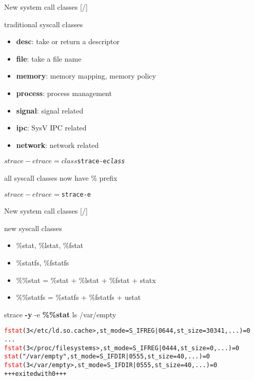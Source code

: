 \documentclass[unicode,aspectratio=169]{beamer}
\begin{document}
\begin{frame}[fragile]{New system call classes \hfill [\insertframenumber/\inserttotalframenumber]}
\begin{block}{\large traditional syscall classes}
\begin{itemize}
\item \textbf{desc}: take or return a descriptor
\item \textbf{file}: take a file name
\item \textbf{memory}: memory mapping, memory policy
\item \textbf{process}: process management
\item \textbf{signal}: signal related
\item \textbf{ipc}: SysV IPC related
\item \textbf{network}: network related
\end{itemize}
\vspace{-2\topsep}
\begin{alltt}
$ strace -e trace=\textit{class}
$ strace -e \textit{class}
\end{alltt}
\end{block}

\begin{block}{\large all syscall classes now have \% prefix}
\begin{alltt}
$ strace -e trace=%\textit{class}
$ strace -e %\textit{class}
\end{alltt}
\end{block}
\end{frame}

\begin{frame}[fragile]{New system call classes \hfill [\insertframenumber/\inserttotalframenumber]}
\begin{block}{\large new syscall classes}
\begin{itemize}
	\item \%stat, \%lstat, \%fstat
	\item \%statfs, \%fstatfs
	\item \%\%stat = \%stat + \%lstat + \%fstat + statx
	\item \%\%statfs = \%statfs + \%fstatfs + ustat
\end{itemize}
\end{block}

\begin{block}{\large strace \textbf{-y} -e \textbf{\%\%stat} ls /var/empty}
\begin{alltt}
\textcolor{red}{fstat}(3</etc/ld.so.cache>, {st_mode=S_IFREG|0644, st_size=30341, ...}) = 0
...
\textcolor{red}{fstat}(3</proc/filesystems>, {st_mode=S_IFREG|0444, st_size=0, ...}) = 0
\textcolor{red}{stat}("/var/empty", {st_mode=S_IFDIR|0555, st_size=40, ...}) = 0
\textcolor{red}{fstat}(3</var/empty>, {st_mode=S_IFDIR|0555, st_size=40, ...}) = 0
+++ exited with 0 +++
\end{alltt}
\end{block}
\end{frame}
\end{document}
